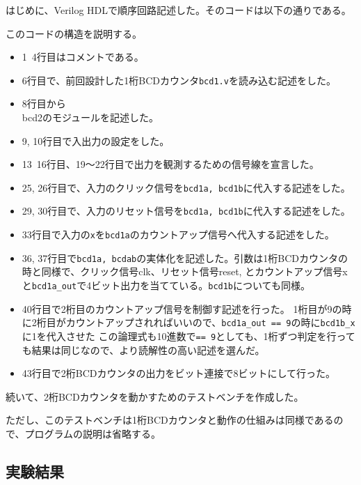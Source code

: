 \documentclass[uplatex]{jsarticle}
\begin{document}
はじめに、Verilog HDLで順序回路記述した。そのコードは以下の通りである。



このコードの構造を説明する。

\begin{itemize}
  \item 1~4行目はコメントである。
  \item 6行目で、前回設計した1桁BCDカウンタ{\tt bcd1.v}を読み込む記述をした。
  \item 8行目から{\\ bcd2}のモジュールを記述した。
  \item 9, 10行目で入出力の設定をした。
  \item 13~16行目、19～22行目で出力を観測するための信号線を宣言した。
  \item 25, 26行目で、入力のクリック信号を{\tt bcd1a, bcd1b}に代入する記述をした。
  \item 29, 30行目で、入力のリセット信号を{\tt bcd1a, bcd1b}に代入する記述をした。
  \item 33行目で入力の{\tt x}を{\tt bcd1a}のカウントアップ信号へ代入する記述をした。
  \item 36, 37行目で{\tt bcd1a, bcdab}の実体化を記述した。引数は1桁BCDカウンタの時と同様で、クリック信号clk、リセット信号reset, 
	  とカウントアップ信号xと{\tt bcd1a\_out}で4ビット出力を当てている。{\tt bcd1b}についても同様。
  \item 40行目で2桁目のカウントアップ信号を制御す記述を行った。
          1桁目が9の時に2桁目がカウントアップされればいいので、{\tt bcd1a\_out == 9}の時に{\tt bcd1b\_x}に1を代入させた
	  この論理式も10進数で{\tt == 9}としても、1桁ずつ判定を行っても結果は同じなので、より読解性の高い記述を選んだ。
  \item 43行目で2桁BCDカウンタの出力をビット連接で8ビットにして行った。
\end{itemize}

続いて、2桁BCDカウンタを動かすためのテストベンチを作成した。



ただし、このテストベンチは1桁BCDカウンタと動作の仕組みは同様であるので、プログラムの説明は省略する。

\subsection{実験結果}
\end{document}
